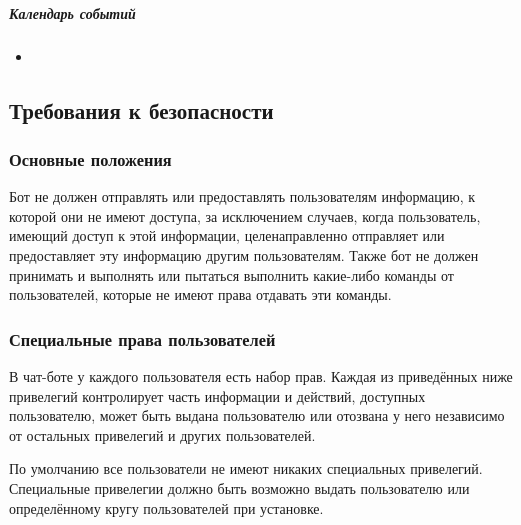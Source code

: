             \subparagraph{Календарь событий}
                \begin{itemize}
                    \item
                \end{itemize}
        \endgroup

\subsection{Требования к безопасности}
    \label{sec:req:sec}
    \subsubsection{Основные положения}
        \label{sec:req:sec:common}
        Бот не должен отправлять или предоставлять пользователям информацию,
        к которой они не имеют доступа, за исключением случаев,
        когда пользователь, имеющий доступ к этой информации, целенаправленно
        отправляет или предоставляет эту информацию другим пользователям.
        Также бот не должен принимать и выполнять или пытаться выполнить какие-либо команды от
        пользователей, которые не имеют права отдавать эти команды.

    \subsubsection{Специальные права пользователей}
        \label{sec:req:sec:privs}
        В чат-боте у каждого пользователя есть набор прав. Каждая из приведённых ниже привелегий
        контролирует часть информации и действий, доступных пользователю,
        может быть выдана пользователю или отозвана у него независимо от остальных привелегий
        и других пользователей.

        По умолчанию все пользователи не имеют никаких специальных привелегий. Специальные привелегии
        должно быть возможно выдать пользователю или определённому кругу пользователей при установке.


